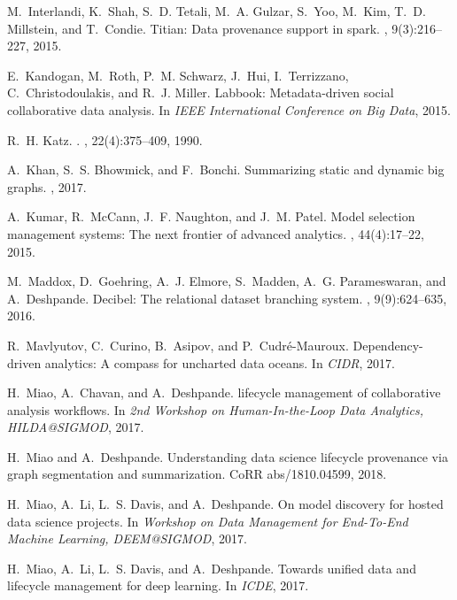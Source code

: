 \documentclass[11pt]{article}
\begin{document}
\begin{thebibliography}{10}
M.~Interlandi, K.~Shah, S.~D. Tetali, M.~A. Gulzar, S.~Yoo, M.~Kim, T.~D.
  Millstein, and T.~Condie.
\newblock Titian: Data provenance support in spark.
, 9(3):216--227, 2015.

E.~Kandogan, M.~Roth, P.~M. Schwarz, J.~Hui, I.~Terrizzano, C.~Christodoulakis,
  and R.~J. Miller.
\newblock Labbook: Metadata-driven social collaborative data analysis.
\newblock In {\em {IEEE} International Conference on Big Data}, 2015.

R.~H. Katz.
.
, 22(4):375--409, 1990.

A.~Khan, S.~S. Bhowmick, and F.~Bonchi.
\newblock Summarizing static and dynamic big graphs.
, 2017.

A.~Kumar, R.~McCann, J.~F. Naughton, and J.~M. Patel.
\newblock Model selection management systems: The next frontier of advanced
  analytics.
, 44(4):17--22, 2015.

M.~Maddox, D.~Goehring, A.~J. Elmore, S.~Madden, A.~G. Parameswaran, and
  A.~Deshpande.
\newblock Decibel: The relational dataset branching system.
, 9(9):624--635, 2016.

R.~Mavlyutov, C.~Curino, B.~Asipov, and P.~Cudr{\'{e}}{-}Mauroux.
\newblock Dependency-driven analytics: {A} compass for uncharted data oceans.
\newblock In {\em {CIDR}}, 2017.

H.~Miao, A.~Chavan, and A.~Deshpande.
 lifecycle management of collaborative analysis workflows.
\newblock In {\em 2nd Workshop on Human-In-the-Loop Data Analytics,
  HILDA@SIGMOD}, 2017.

H.~Miao and A.~Deshpande.
\newblock Understanding data science lifecycle provenance via graph
  segmentation and summarization.
\newblock CoRR abs/1810.04599, 2018.

H.~Miao, A.~Li, L.~S. Davis, and A.~Deshpande.
\newblock On model discovery for hosted data science projects.
\newblock In {\em Workshop on Data Management for End-To-End Machine Learning,
  DEEM@SIGMOD}, 2017.

H.~Miao, A.~Li, L.~S. Davis, and A.~Deshpande.
\newblock Towards unified data and lifecycle management for deep learning.
\newblock In {\em ICDE}, 2017.


\end{thebibliography}
\end{document}
